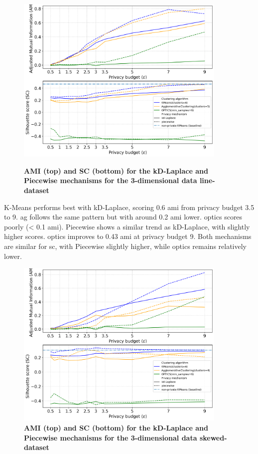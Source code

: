 \begin{figure}[H]
  \centering

  \caption{\textbf{AMI (top) and SC (bottom) for the kD-Laplace and Piecewise mechanisms for the 3-dimensional data line-dataset}}
  \includegraphics[width=0.9\textwidth]{Results/kd-laplace/kd-Laplace/line-dataset/ami-and-sc_3_dimensions.png}
  \label{fig:validation-line-dataset_comparison_3d-laplace}
\end{figure}
K-Means performs best with kD-Laplace, scoring 0.6 \gls{ami} from privacy budget 3.5 to 9.
\gls{ag} follows the same pattern but with around 0.2 \gls{ami} lower.
\gls{optics} scores poorly (< 0.1 \gls{ami}).
Piecewise shows a similar trend as kD-Laplace, with slightly higher scores. \gls{optics} improves to 0.43 \gls{ami} at privacy budget 9.
Both mechanisms are similar for \gls{sc}, with Piecewise slightly higher, while \gls{optics} remains relatively lower.
\newpage
\begin{figure}[H]
  \centering

  \caption{\textbf{AMI (top) and SC (bottom) for the kD-Laplace and Piecewise mechanisms for the 3-dimensional data skewed-dataset}}
  \includegraphics[width=0.9\textwidth]{Results/kd-laplace/kd-Laplace/skewed-dataset/ami-and-sc_3_dimensions.png}

  \label{fig:validation-skewed-dataset_comparison_3d-laplace}
\end{figure}
